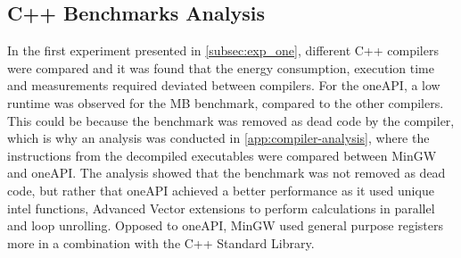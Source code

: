\subsection{C++ Benchmarks Analysis}

In the first experiment presented in \cref{subsec:exp_one}, different C++ compilers were compared and it was found that the energy consumption, execution time and measurements required deviated between compilers. For the oneAPI, a low runtime was observed for the MB benchmark, compared to the other compilers. This could be because the benchmark was removed as dead code by the compiler, which is why an analysis was conducted in \cref{app:compiler-analysis}, where the instructions from the decompiled executables were compared between MinGW and oneAPI. The analysis showed that the benchmark was not removed as dead code, but rather that oneAPI achieved a better performance as it used unique intel functions, Advanced Vector extensions to perform calculations in parallel and loop unrolling. Opposed to oneAPI, MinGW used general purpose registers more in a combination with the C++ Standard Library.  







